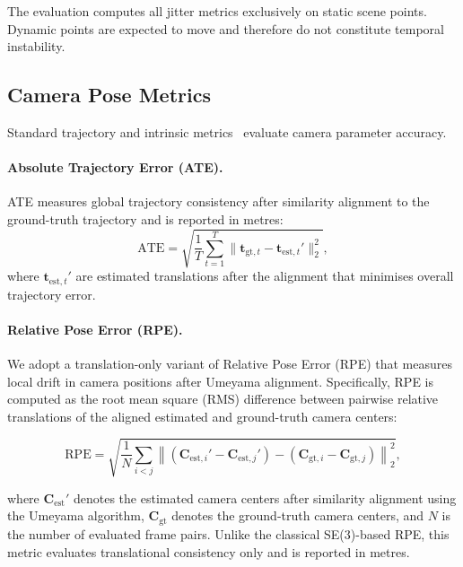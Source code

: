 The evaluation computes all jitter metrics exclusively on static scene points. Dynamic points are expected to move and therefore do not constitute temporal instability.

\subsection{Camera Pose Metrics}

Standard trajectory and intrinsic metrics~\cite{sturm12iros} evaluate camera parameter accuracy.

\paragraph{Absolute Trajectory Error (ATE).}
ATE measures global trajectory consistency after similarity alignment to the ground-truth trajectory and is reported in metres:
\begin{equation}
\text{ATE} = \sqrt{\frac{1}{T}\sum_{t=1}^{T}
\bigl\|\mathbf{t}_{\text{gt},t} - \mathbf{t}_{\text{est},t}'\bigr\|_2^2},
\end{equation}
where $\mathbf{t}_{\text{est},t}'$ are estimated translations after the alignment that minimises overall trajectory error.

\paragraph{Relative Pose Error (RPE).}

We adopt a translation-only variant of Relative Pose Error (RPE) that measures local drift in camera positions after Umeyama alignment. Specifically, RPE is computed as the root mean square (RMS) difference between pairwise relative translations of the aligned estimated and ground-truth camera centers:

\begin{equation}
\text{RPE} =
\sqrt{\frac{1}{N}\sum_{i<j}
\left\|
(\mathbf{C}_{\mathrm{est},i}' - \mathbf{C}_{\mathrm{est},j}')
-
(\mathbf{C}_{\mathrm{gt},i} - \mathbf{C}_{\mathrm{gt},j})
\right\|_2^2},
\end{equation}

where $\mathbf{C}_{\mathrm{est}}'$ denotes the estimated camera centers after similarity alignment using the Umeyama algorithm, $\mathbf{C}_{\mathrm{gt}}$ denotes the ground-truth camera centers, and $N$ is the number of evaluated frame pairs. Unlike the classical SE(3)-based RPE, this metric evaluates translational consistency only and is reported in metres.

